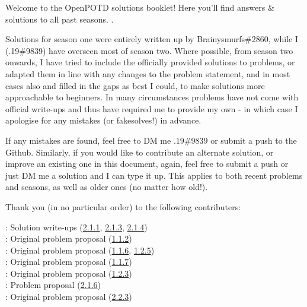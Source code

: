 Welcome to the OpenPOTD solutions booklet! Here you'll find answers \& solutions to all past seasons.\medskip
.

Solutions for season one were entirely written up by Brainysmurfs\#2860, while I (.19\#9839) have overseen most of season two. 
Where possible, from season two onwards, I have tried to include the officially provided solutions to problems, or adapted them in line with any changes to the problem statement, and in most cases also and filled in the gaps as best I could, to make solutions more approachable to beginners. 
In many circumstances problems have not come with official write-ups and thus have required me to provide my own - in which case I apologise for any mistakes (or fakesolves!) in advance.\medskip

If any mistakes are found, feel free to DM me \(.19\#9839\) or submit a push to the Github.
Similarly, if you would like to contribute an alternate solution, or improve an existing one in this document, again, feel free to submit a push or just DM me a solution and I can type it up. 
This applies to both recent problems and seasons, as well as older ones (no matter how old!).\bigskip 


Thank you (in no particular order) to the following contributers:\medskip

\Paiya: Solution write-ups (\hyperref[2.1.1]{2.1.1}, \hyperref[2.1.3]{2.1.3}, \hyperref[2.1.4]{2.1.4})\\
\Ptony: Original problem proposal (\hyperref[1.1.2]{1.1.2})\\
\Ppi: Original problem proposal (\hyperref[1.1.6]{1.1.6}, \hyperref[1.2.5]{1.2.5})\\
\Pbfan: Original problem proposal (\hyperref[1.1.7]{1.1.7})\\
\Pkiesh: Original problem proposal (\hyperref[1.2.3]{1.2.3})\\
\Pchris: Problem proposal (\hyperref[2.1.6]{2.1.6})\\
\Pkee: Original problem proposal (\hyperref[2.2.3]{2.2.3})\\
\medskip